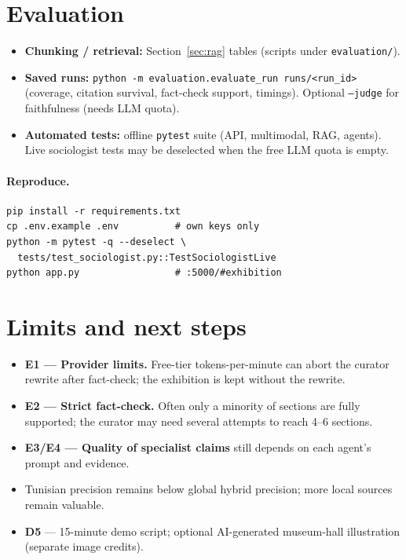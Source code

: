 \documentclass[11pt,a4paper]{article}
\begin{document}
\section{Evaluation}

\begin{itemize}
  \item \textbf{Chunking / retrieval:} Section~\ref{sec:rag} tables (scripts under \texttt{evaluation/}).
  \item \textbf{Saved runs:} \texttt{python -m evaluation.evaluate\_run runs/<run\_id>} (coverage, citation survival, fact-check support, timings). Optional \texttt{--judge} for faithfulness (needs LLM quota).
  \item \textbf{Automated tests:} offline \texttt{pytest} suite (API, multimodal, RAG, agents). Live sociologist tests may be deselected when the free LLM quota is empty.
\end{itemize}

\paragraph{Reproduce.}
\begin{verbatim}
pip install -r requirements.txt
cp .env.example .env          # own keys only
python -m pytest -q --deselect \
  tests/test_sociologist.py::TestSociologistLive
python app.py                 # :5000/#exhibition
\end{verbatim}

\section{Limits and next steps}

\begin{itemize}
  \item \textbf{E1 --- Provider limits.} Free-tier tokens-per-minute can abort the curator rewrite after fact-check; the exhibition is kept without the rewrite.
  \item \textbf{E2 --- Strict fact-check.} Often only a minority of sections are fully supported; the curator may need several attempts to reach 4--6 sections.
  \item \textbf{E3/E4 --- Quality of specialist claims} still depends on each agent's prompt and evidence.
  \item Tunisian precision remains below global hybrid precision; more local sources remain valuable.
  \item \textbf{D5} --- 15-minute demo script; optional AI-generated museum-hall illustration (separate image credits).
\end{itemize}
\end{document}
